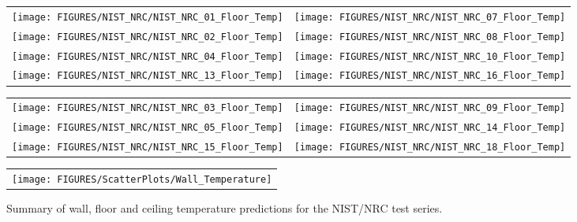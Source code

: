 \begin{figure}[p]
\begin{tabular*}{\textwidth}{l@{\extracolsep{\fill}}r}
\texttt{[image: FIGURES/NIST\_NRC/NIST\_NRC\_01\_Floor\_Temp]} &
\texttt{[image: FIGURES/NIST\_NRC/NIST\_NRC\_07\_Floor\_Temp]} \\
\texttt{[image: FIGURES/NIST\_NRC/NIST\_NRC\_02\_Floor\_Temp]} &
\texttt{[image: FIGURES/NIST\_NRC/NIST\_NRC\_08\_Floor\_Temp]} \\
\texttt{[image: FIGURES/NIST\_NRC/NIST\_NRC\_04\_Floor\_Temp]} &
\texttt{[image: FIGURES/NIST\_NRC/NIST\_NRC\_10\_Floor\_Temp]} \\
\texttt{[image: FIGURES/NIST\_NRC/NIST\_NRC\_13\_Floor\_Temp]} &
\texttt{[image: FIGURES/NIST\_NRC/NIST\_NRC\_16\_Floor\_Temp]}
\end{tabular*}
\label{NIST_NRC_Floor_Temp_Closed}
\end{figure}

\begin{figure}[p]
\begin{tabular*}{\textwidth}{l@{\extracolsep{\fill}}r}
\texttt{[image: FIGURES/NIST\_NRC/NIST\_NRC\_03\_Floor\_Temp]} &
\texttt{[image: FIGURES/NIST\_NRC/NIST\_NRC\_09\_Floor\_Temp]} \\
\texttt{[image: FIGURES/NIST\_NRC/NIST\_NRC\_05\_Floor\_Temp]} &
\texttt{[image: FIGURES/NIST\_NRC/NIST\_NRC\_14\_Floor\_Temp]} \\
\texttt{[image: FIGURES/NIST\_NRC/NIST\_NRC\_15\_Floor\_Temp]} &
\texttt{[image: FIGURES/NIST\_NRC/NIST\_NRC\_18\_Floor\_Temp]}
\end{tabular*}
\label{NIST_NRC_Floor_Temp_Open}
\end{figure}



\begin{figure}[p]
\begin{center}
\begin{tabular}{c}
\texttt{[image: FIGURES/ScatterPlots/Wall\_Temperature]}
\end{tabular}
\end{center}
\caption[Summary of wall, floor and ceiling temperature predictions, NIST/NRC test series.]
{Summary of wall, floor and ceiling temperature predictions for the NIST/NRC test series.}
\end{figure}
